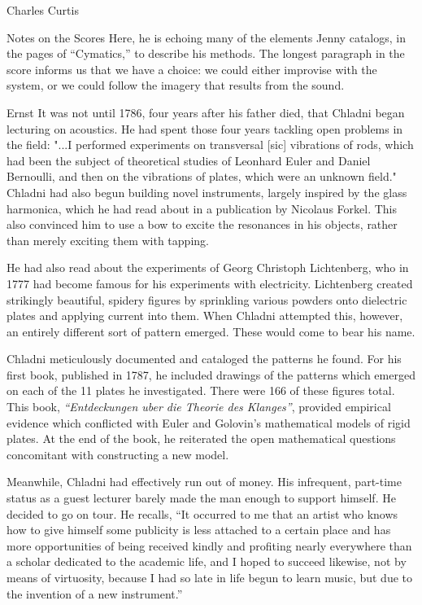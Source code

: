 \documentclass[a4paper,10pt]{report}
\numberwithin{equation}{section}
\begin{document}
\begin{chapter}{Charles Curtis}
\begin{section}{Notes on the Scores}
Here, he is echoing many of the elements Jenny catalogs, in the pages of ``Cymatics,'' to describe his methods.\cite{Jenny2001} The longest paragraph in the score informs us that we have a choice: we could either improvise with the system, or we could follow the imagery that results from the sound.
\end{section}
\begin{section}{Ernst}\label{chladni}
 It was not until 1786, four years after his father died, that Chladni began lecturing on acoustics. He had spent those four years tackling open problems in the field: "...I performed experiments on transversal [sic] vibrations of rods, which had been the subject of theoretical studies of Leonhard Euler and Daniel Bernoulli, and then on the vibrations of plates, which were an unknown field."\cite[p.~27]{Ullmann2007} Chladni had also begun building novel instruments, largely inspired by the glass harmonica, which he had read about in a publication by Nicolaus Forkel. This also convinced him to use a bow to excite the resonances in his objects, rather than merely exciting them with tapping.\cite[p.~27]{Ullmann2007}

He had also read about the experiments of Georg Christoph Lichtenberg, who in 1777 had become famous for his experiments with electricity. Lichtenberg created strikingly beautiful, spidery figures by sprinkling various powders onto dielectric plates and applying current into them. When Chladni attempted this, however, an entirely different sort of pattern emerged. These would come to bear his name.\cite[p.~27]{Ullmann2007}

Chladni meticulously documented and cataloged the patterns he found. For his first book, published in 1787, he included drawings of the patterns which emerged on each of the 11 plates he investigated. There were 166 of these figures total. This book, \emph{``Entdeckungen uber die Theorie des Klanges''}, provided empirical evidence which conflicted with Euler and Golovin's mathematical models of rigid plates. At the end of the book, he reiterated the open mathematical questions concomitant with constructing a new model.\cite[p.~27]{Ullmann2007}

Meanwhile, Chladni had effectively run out of money. His infrequent, part-time status as a guest lecturer barely made the man enough to support himself.\cite[p.~27]{Ullmann2007} He decided to go on tour. He recalls, 
``It occurred to me that an artist who knows how to give himself some publicity is less attached to a certain place and has more opportunities of being received kindly and profiting nearly everywhere than a scholar dedicated to the academic life, and I hoped to succeed likewise, not by means of virtuosity, because I had so late in life begun to learn music, but due to the invention of a new instrument.''\cite[p.~17]{Stockmann2007}


\end{section}
\end{chapter}
\end{document}
